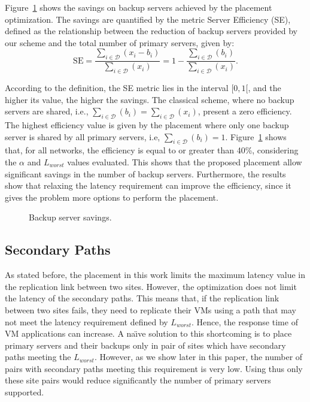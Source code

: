 \documentclass[preprint]{elsarticle}
\begin{document}
Figure~\ref{zeroRPOfig:ratioIaaSservers} shows the savings on backup servers achieved by the placement optimization. The savings are quantified by the metric Server Efficiency (SE), defined as the relationship between the reduction of backup servers provided by our scheme and the total number of primary servers, given by:
\begin{equation}
\text{SE} = \frac{ \sum_{i \in \mathcal{D}} (x_i  - b_i)}{\sum_{i \in \mathcal{D}} (x_i)} = 1 - \frac{\sum_{i \in \mathcal{D}} (b_i)}{\sum_{i \in \mathcal{D}} (x_i)}.
\end{equation}

According to the definition, the SE metric lies in the interval $[0,1[$, and the higher its value, the higher the savings. The classical scheme, where no backup servers are shared, i.e., $\sum_{i \in \mathcal{D}} (b_i)=\sum_{i \in \mathcal{D}} (x_i)$, present a zero efficiency. The highest efficiency value is given by the placement where only one backup server is shared by all primary servers, i.e, $\sum_{i \in \mathcal{D}} (b_i)=1$. 
Figure~\ref{zeroRPOfig:ratioIaaSservers} shows that, for all networks, the efficiency is equal to or greater than 40\%, considering the $\alpha$ and $L_{worst}$ values evaluated. This shows that the proposed placement allow significant savings in the number of backup servers. Furthermore, the results show that relaxing the latency requirement can improve the efficiency, since it gives the problem more options to perform the placement. 
\begin{figure}[ht!]
\centering
{}
\caption{Backup server savings.}
\label{zeroRPOfig:ratioIaaSservers}
\end{figure}

\subsection{Secondary Paths}
\label{zeroRPOsubsec:caminhosSecundarios}

As stated before, the placement in this work limits the maximum latency value in the replication link between two sites. However, the optimization does not limit the latency of the secondary paths. This means that, if the replication link between two sites fails, they need to replicate their VMs using a path that may not meet the latency requirement defined by $L_{worst}$. Hence, the response time of VM applications can increase. A na\"{\i}ve solution to this shortcoming is to place primary servers and their backups only in pair of sites which have secondary paths meeting the $L_{worst}$. However, as we show later in this paper, the number of pairs with secondary paths meeting this requirement is very low. Using thus only these site pairs would reduce significantly the number of primary servers supported.
\end{document}
